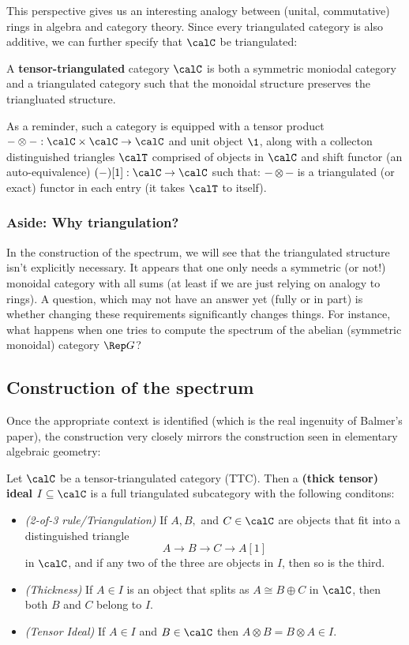 \documentclass[12pt]{article}
\begin{document}
This perspective gives us an interesting analogy between (unital, commutative) rings in algebra and category theory. Since every 
triangulated category is also additive, we can further specify that $\calC$ be triangulated:
\begin{defn}
	A \textbf{tensor-triangulated} category $\calC$ is both a symmetric moniodal category and a triangulated category such that 
	the monoidal structure preserves the triangluated structure. 

	As a reminder, such a category is equipped with a tensor product $-\otimes -:\calC\times\calC\to \calC$ and unit object $\1$, along with
	a collecton distinguished triangles $\calT$ comprised of objects in $\calC$ and shift functor (an auto-equivalence) $(-)[1]:\calC\to \calC$ such that:
	$-\otimes-$ is a triangulated (or exact) functor in each entry (it takes $\calT$ to itself).
\end{defn}

\subsubsection{Aside: Why triangulation?}
In the construction of the spectrum, we will see that the triangulated structure isn't explicitly necessary. It appears that 
one only needs a symmetric (or not!) monoidal category with all sums (at least if we are just relying on analogy to rings). A question, 
which may not have an answer yet (fully or in part) is whether changing these requirements significantly changes things. For instance, 
what happens when one tries to compute the spectrum of the abelian (symmetric monoidal) category $\Rep G$?

\subsection{Construction of the spectrum}
Once the appropriate context is identified (which is the real ingenuity of Balmer's paper), the construction 
very closely mirrors the construction seen in elementary algebraic geometry:
\begin{defn}
	Let $\calC$ be a tensor-triangulated category (TTC). Then a \textbf{(thick tensor) ideal} $I\subseteq \calC$ is a full triangulated subcategory 
	with the following conditons:
	\begin{itemize}
		\item \textit{(2-of-3 rule/Triangulation)} If $A,B,$ and $C\in\calC$ are objects that fit into a distinguished triangle
		\[A\to B\to C\to A[1]\]
		in $\calC$, and if any two of the three are objects in $I$, then so is the third.
		\item \textit{(Thickness)} If $A\in I$ is an object that splits as $A\cong B\oplus C$ in $\calC$, then both $B$ and $C$ belong to $I$.
		\item \textit{(Tensor Ideal)} If $A\in I$ and $B\in \calC$ then $A\otimes B=B\otimes A\in I$.
	\end{itemize}
\end{defn}
\end{document}
